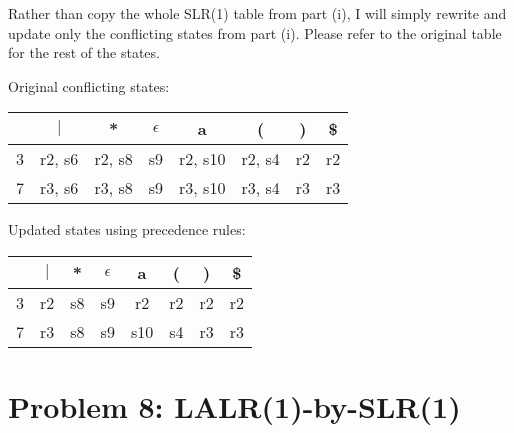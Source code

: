 \documentclass{article}
\begin{document}
\begin{enumerate}[i.]
		Rather than copy the whole SLR(1) table from part (i), I will
		simply rewrite and update only the conflicting states from part
		(i). Please refer to the original table for the rest of the
		states.

		Original conflicting states:

		\begin{tabular}{|c|c|c|c|c|c|c|c|}
			                                                                     \hline
			   &  $|$   &  *     & $\epsilon$ &   a      &  (     &   ) &  \$ \\ \hline
			3  & r2, s6 & r2, s8 &     s9     &  r2, s10 & r2, s4 &  r2 &  r2 \\ \hline
			7  & r3, s6 & r3, s8 &     s9     &  r3, s10 & r3, s4 &  r3 &  r3 \\ \hline
		\end{tabular}

		Updated states using precedence rules:

		\begin{tabular}{|c|c|c|c|c|c|c|c|}
			                                                                     \hline
			   & $|$ &  * & $\epsilon$ &   a &  ( &  ) & \$ \\ \hline
			3  &  r2 & s8 &     s9     &  r2 & r2 & r2 & r2 \\ \hline
			7  &  r3 & s8 &     s9     & s10 & s4 & r3 & r3 \\ \hline
		\end{tabular}
\end{enumerate}

\section{Problem 8: LALR(1)-by-SLR(1)}
\end{document}
